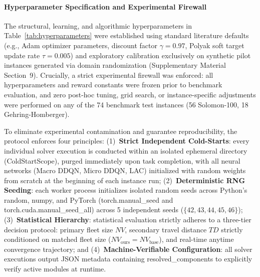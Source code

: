 \documentclass{ieeeaccess}
\begin{document}
\paragraph{Hyperparameter Specification and Experimental Firewall}
The structural, learning, and algorithmic hyperparameters in Table~\ref{tab:hyperparameters} were established using standard literature defaults (e.g., Adam optimizer parameters, discount factor $\gamma=0.97$, Polyak soft target update rate $\tau=0.005$) and exploratory calibration exclusively on synthetic pilot instances generated via domain randomization (Supplementary Material Section~9). Crucially, a strict experimental firewall was enforced: all hyperparameters and reward constants were frozen prior to benchmark evaluation, and zero post-hoc tuning, grid search, or instance-specific adjustments were performed on any of the 74 benchmark test instances (56 Solomon-100, 18 Gehring-Homberger).

To eliminate experimental contamination and guarantee reproducibility, the protocol enforces four principles: (1)~\textbf{Strict Independent Cold-Starts}: every individual solver execution is conducted within an isolated ephemeral directory (\textsf{\small ColdStartScope}), purged immediately upon task completion, with all neural networks (Macro DDQN, Micro DDQN, LAC) initialized with random weights from scratch at the beginning of each instance run; (2)~\textbf{Deterministic RNG Seeding}: each worker process initializes isolated random seeds across Python's \textsf{\small random}, \textsf{\small numpy}, and PyTorch (\textsf{\small torch.manual\_seed} and \textsf{\small torch.cuda.manual\_seed\_all}) across 5 independent seeds ($\{42, 43, 44, 45, 46\}$); (3)~\textbf{Statistical Hierarchy}: statistical evaluation strictly adheres to a three-tier decision protocol: primary fleet size $NV$, secondary travel distance $TD$ strictly conditioned on matched fleet size ($NV_{\text{ours}} = NV_{\text{base}}$), and real-time anytime convergence trajectory; and (4)~\textbf{Machine-Verifiable Configuration}: all solver executions output JSON metadata containing \textsf{\small resolved\_components} to explicitly verify active modules at runtime.
\end{document}
